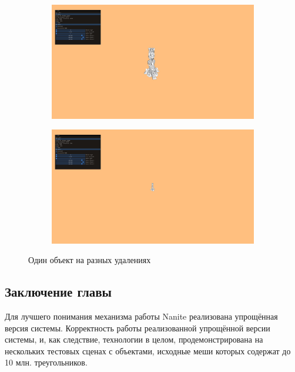 \begin{figure}[H]
    \begin{subfigure}{.45\textwidth}
        \includegraphics[width=\textwidth]{pics/example-2.png}
    \end{subfigure}
    \begin{subfigure}{.45\textwidth}
        \includegraphics[width=\textwidth]{pics/example-3.png}
    \end{subfigure}
    \caption{Один объект на разных удалениях}
    \label{fig:impl-example}
\end{figure}

\subsection*{Заключение главы}
Для лучшего понимания механизма работы Nanite реализована упрощённая версия системы.
Корректность работы реализованной упрощённой версии системы, и, как следствие, технологии в целом, продемонстрирована на нескольких тестовых сценах с объектами, исходные меши которых содержат до 10 млн. треугольников.
